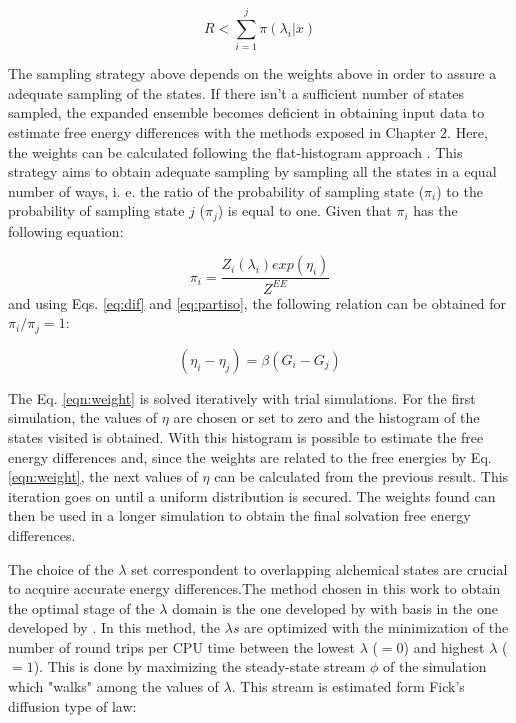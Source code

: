 \begin{equation}
R < \sum_{i=1}^{j} \pi(\lambda_{i}|x) 
\label{eqn:relee2}
\end{equation} 

The sampling strategy above depends on the weights above in order to assure a adequate sampling of the states. If there isn't a sufficient number of states sampled, the expanded ensemble becomes deficient in obtaining input data to estimate free energy differences with the methods exposed in Chapter 2. Here, the weights can be calculated following the flat-histogram approach \cite{bernd1992,bernd1993,dayal2004}. This strategy aims to obtain adequate sampling by sampling all the states in a equal number of ways, i. e. the ratio of the probability of sampling state ($\pi_{i}$) to the probability of sampling state $j$ ($\pi_{j}$) is equal to one. Given that $\pi_{i}$ has the following equation:

\begin{equation}
\pi_{i} = \dfrac{Z_{i}(\lambda_{i}) exp(\eta_{i})}{Z^{EE}} 
\label{eqn:wei1}
\end{equation} 
and using Eqs. \ref{eq:dif} and \ref {eq:partiso}, the following relation can be obtained for $\pi_{i}/\pi_{j}=1$:

\begin{equation}
(\eta_{i} - \eta_{j}) = \beta(G_i-G_j)
\label{eqn:weight}
\end{equation}

The Eq. \eqref{eqn:weight} is solved iteratively with trial simulations. For the first simulation, the values of $\eta$ are chosen or set to zero and the histogram of the states visited is obtained. With this histogram is possible to estimate the free energy differences and, since the weights are related to the free energies by Eq. \eqref{eqn:weight}, the next values of $\eta$ can be calculated  from the previous result. This iteration goes on until a uniform distribution is secured. The weights found can then  be used in a longer simulation to obtain the final solvation free energy differences.

The choice of the $\lambda$ set correspondent to overlapping alchemical states are crucial to acquire accurate energy differences.The method chosen in this work to obtain the optimal stage of the $\lambda$ domain is the one developed by  with basis in the one developed by . In this method, the $\lambda s$ are optimized with the minimization of the number of round trips per CPU time between the lowest $\lambda$ ($=0$) and highest $\lambda$ ($=1$). This is done by maximizing the steady-state stream $\phi$ of the simulation which "walks" among the values of $\lambda$. This stream is estimated form Fick's diffusion type of law:

